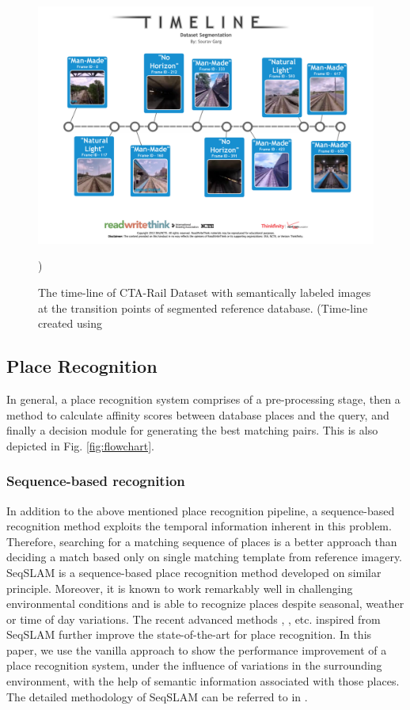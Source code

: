 \documentclass[letterpaper, 10 pt, conference]{ieeeconf}  %
\begin{document}
\begin{figure}[!htbp]
 \includegraphics[clip, trim=2cm 4cm 2cm 4cm,scale=0.35]{cta-dataset-segmentation-1}
 \caption{The time-line of CTA-Rail Dataset with semantically labeled images at the transition points of segmented reference database. (Time-line created using \cite{timelineRWT}})
 \label{fig:datasetLabels}
\end{figure}

\subsection{Place Recognition}
In general, a place recognition system comprises of a pre-processing stage, then a method to calculate affinity scores between database places and the query, and finally a decision module for generating the best matching pairs. This is also depicted in Fig. \ref{fig:flowchart}.
\subsubsection{Sequence-based recognition}
In addition to the above mentioned place recognition pipeline, a sequence-based recognition method exploits the temporal information inherent in this problem. Therefore, searching for a matching sequence of places is a better approach than deciding a match based only on single matching template from reference imagery. SeqSLAM \cite{Milford2012} is a sequence-based place recognition method developed on similar principle. Moreover, it is known to work remarkably well in challenging environmental conditions and is able to recognize places despite seasonal, weather or time of day variations. The recent advanced methods \cite{milford2015sequence}, \cite{wang2015improved}, \cite{milford2015place} etc. inspired from SeqSLAM further improve the state-of-the-art for place recognition. In this paper, we use the vanilla approach to show the performance improvement of a place recognition system, under the influence of variations in the surrounding environment, with the help of semantic information associated with those places. The detailed methodology of SeqSLAM can be referred to in \cite{Milford2012}.
\end{document}
